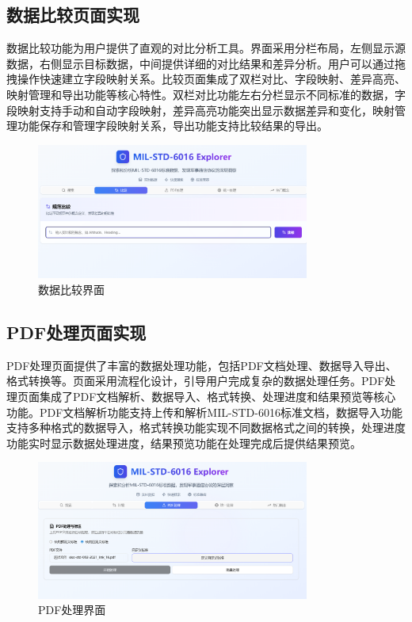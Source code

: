 \subsection{数据比较页面实现}

数据比较功能为用户提供了直观的对比分析工具。界面采用分栏布局，左侧显示源数据，右侧显示目标数据，中间提供详细的对比结果和差异分析。用户可以通过拖拽操作快速建立字段映射关系。比较页面集成了双栏对比、字段映射、差异高亮、映射管理和导出功能等核心特性。双栏对比功能左右分栏显示不同标准的数据，字段映射支持手动和自动字段映射，差异高亮功能突出显示数据差异和变化，映射管理功能保存和管理字段映射关系，导出功能支持比较结果的导出。

\begin{figure}[H]
\centering
\includegraphics[width=0.8\textwidth]{chapters/fig-0/front_compare.png}
\caption{数据比较界面}
\label{fig:frontend-compare}
\end{figure}

\subsection{PDF处理页面实现}

PDF处理页面提供了丰富的数据处理功能，包括PDF文档处理、数据导入导出、格式转换等。页面采用流程化设计，引导用户完成复杂的数据处理任务。PDF处理页面集成了PDF文档解析、数据导入、格式转换、处理进度和结果预览等核心功能。PDF文档解析功能支持上传和解析MIL-STD-6016标准文档，数据导入功能支持多种格式的数据导入，格式转换功能实现不同数据格式之间的转换，处理进度功能实时显示数据处理进度，结果预览功能在处理完成后提供结果预览。

\begin{figure}[H]
\centering
\includegraphics[width=0.8\textwidth]{chapters/fig-0/front_pdfprocess.png}
\caption{PDF处理界面}
\label{fig:frontend-pdfprocess}
\end{figure}

